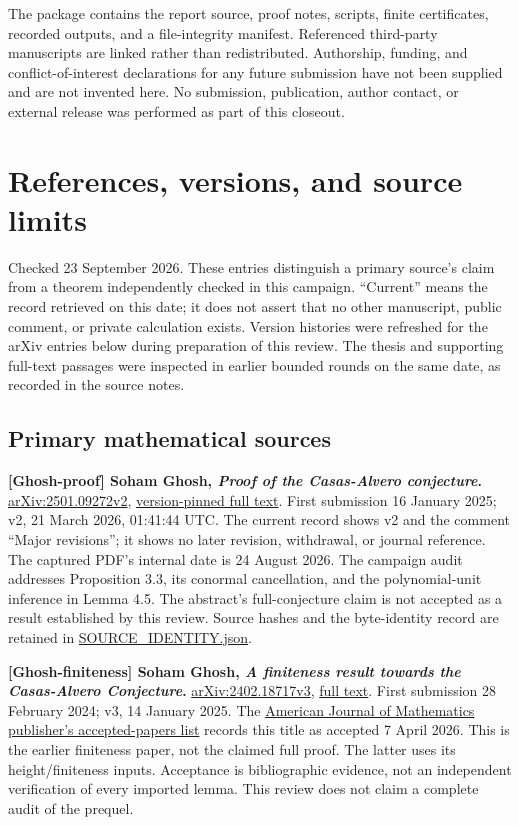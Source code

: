 \documentclass[
  british,
  10pt,
]{article}
\begin{document}
The package contains the report source, proof notes, scripts, finite
certificates, recorded outputs, and a file-integrity manifest.
Referenced third-party manuscripts are linked rather than redistributed.
Authorship, funding, and conflict-of-interest declarations for any
future submission have not been supplied and are not invented here. No
submission, publication, author contact, or external release was
performed as part of this closeout.

\section{References, versions, and source
limits}\label{references-versions-and-source-limits}

Checked 23 September 2026. These entries distinguish a primary source's
claim from a theorem independently checked in this campaign. ``Current''
means the record retrieved on this date; it does not assert that no
other manuscript, public comment, or private calculation exists. Version
histories were refreshed for the arXiv entries below during preparation
of this review. The thesis and supporting full-text passages were
inspected in earlier bounded rounds on the same date, as recorded in the
source notes.

\subsection{Primary mathematical
sources}\label{primary-mathematical-sources}

\textbf{{[}Ghosh-proof{]} Soham Ghosh, \emph{Proof of the Casas-Alvero
conjecture}.}
\href{https://arxiv.org/abs/2501.09272v2}{arXiv:2501.09272v2},
\href{https://arxiv.org/html/2501.09272v2}{version-pinned full text}.
First submission 16 January 2025; v2, 21 March 2026, 01:41:44 UTC. The
current record shows v2 and the comment ``Major revisions''; it shows no
later revision, withdrawal, or journal reference. The captured PDF's
internal date is 24 August 2026. The campaign audit addresses
Proposition 3.3, its conormal cancellation, and the polynomial-unit
inference in Lemma 4.5. The abstract's full-conjecture claim is not
accepted as a result established by this review. Source hashes and the
byte-identity record are retained in
\href{evidence/audit/SOURCE_IDENTITY.json}{SOURCE\_IDENTITY.json}.

\textbf{{[}Ghosh-finiteness{]} Soham Ghosh, \emph{A finiteness result
towards the Casas-Alvero Conjecture}.}
\href{https://arxiv.org/abs/2402.18717v3}{arXiv:2402.18717v3},
\href{https://arxiv.org/html/2402.18717v3}{full text}. First submission
28 February 2024; v3, 14 January 2025. The
\href{https://www.press.jhu.edu/journals/american-journal-mathematics}{American
Journal of Mathematics publisher's accepted-papers list} records this
title as accepted 7 April 2026. This is the earlier finiteness paper,
not the claimed full proof. The latter uses its height/finiteness
inputs. Acceptance is bibliographic evidence, not an independent
verification of every imported lemma. This review does not claim a
complete audit of the prequel.
\end{document}
